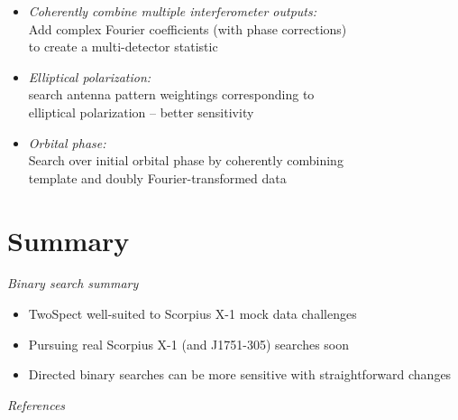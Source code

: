 \begin{itemize}
\item \emph{Coherently combine multiple interferometer outputs: }\\
Add complex Fourier coefficients (with phase corrections)\\
to create a multi-detector statistic
\item \emph{Elliptical polarization:}\\
search antenna pattern weightings corresponding to\\
elliptical polarization -- better sensitivity
\item \emph{Orbital phase:}\\
Search over initial orbital phase by coherently combining\\
template and doubly Fourier-transformed data
\end{itemize}

\section{Summary}


\emph{Binary search summary}
\begin{itemize}
\item TwoSpect well-suited to Scorpius X-1 mock data challenges
\item Pursuing real Scorpius X-1 (and J1751-305) searches soon
\item Directed binary searches can be more sensitive with straightforward
changes
\end{itemize}







\emph{References}


